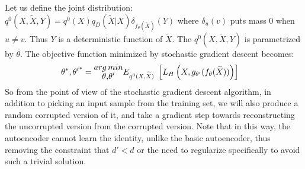 Let us define the joint distribution: 
\( q^0(X,\widetilde{X},Y) = q^0(X)q_D(\widetilde{X}|X)\delta_{f_{\theta}(\widetilde{X})}(Y) \)
where \(\delta_u(v)\) puts mass 0 when \(u \ne v\). Thus $Y$ is a deterministic function of \(\widetilde{X}\). The \(q^0(X,\widetilde{X},Y)\) is parametrized by $\theta$. The objective function minimized by stochastic gradient descent becomes:
\begin{equation}\label{eq:sdearmin}
\centering
\begin{aligned}
{\theta}^*, {\theta'}^* &= {\Large\substack{arg\, min \\ {\theta, \theta'}}} E_{q^0(X,\widetilde{X})}\ \left[ L_H\left(X, g_{\theta'}(f_{\theta}(\widetilde{X}))\right)\right]
\end{aligned}
\end{equation}
So from the point of view of the stochastic gradient descent algorithm, in addition to picking an input sample from the training set, we will also produce a random corrupted version of it, and take a gradient step towards reconstructing the uncorrupted version from the corrupted version. Note that in this way, the autoencoder cannot learn the identity, unlike the basic autoencoder, thus removing the constraint that \(d' < d \) or the need to regularize specifically to avoid such a trivial solution.

